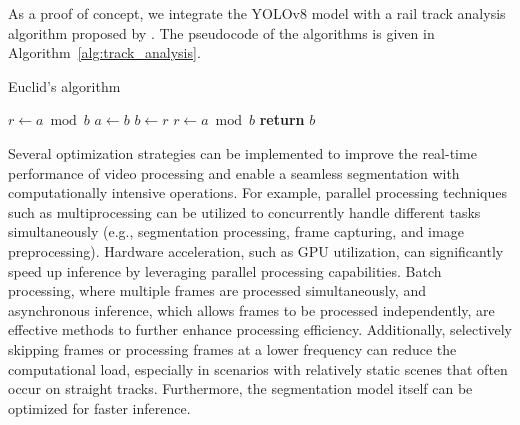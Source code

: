 \documentclass[Master,MDS,english]{BASE/twbook} %
\begin{document}
As a proof of concept, we integrate the YOLOv8 model with a rail track analysis algorithm proposed by \cite{danieles_algorithm}. The pseudocode of the algorithms is given in Algorithm~\ref{alg:track_analysis}.


\begin{algorithm}
\caption{Euclid’s algorithm}\label{alg:track_analysis}
\begin{algorithmic}[1]
\State $r\gets a\bmod b$
\State $a\gets b$
\State $b\gets r$
\State $r\gets a\bmod b$
\EndWhile\label{euclidendwhile}
\State \textbf{return} $b$
\EndProcedure
\end{algorithmic}
\end{algorithm}



Several optimization strategies can be implemented to improve the real-time performance of video processing and enable a seamless segmentation with computationally intensive operations.
For example, parallel processing techniques such as multiprocessing can be utilized to concurrently handle different tasks simultaneously (e.g., segmentation processing, frame capturing, and image preprocessing). 
Hardware acceleration, such as GPU utilization, can significantly speed up inference by leveraging parallel processing capabilities. Batch processing, where multiple frames are processed simultaneously, and asynchronous inference, which allows frames to be processed independently, are effective methods to further enhance processing efficiency. 
Additionally, selectively skipping frames or processing frames at a lower frequency can reduce the computational load, especially in scenarios with relatively static scenes that often occur on straight tracks. Furthermore, the segmentation model itself can be optimized for faster inference. 
\end{document}
